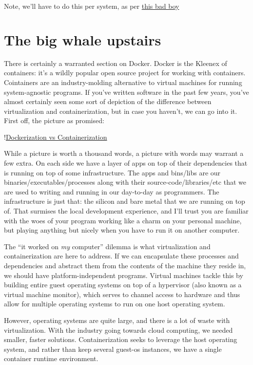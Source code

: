 \documentclass[11pt, twoside, reqno]{book}
\begin{document}
Note, we'll have to do this per system, as per \href{https://www.digitalocean.com/community/questions/error-permission-denied-publickey-when-i-try-to-ssh}{this bad boy}

\section{The big whale upstairs}

There is certainly a warranted section on Docker. Docker is the Kleenex of containers: it's a wildly popular open source project for working with containers. Cointainers are an industry-molding alternative to virtual machines for running system-agnostic programs. If you've written software in the past few years, you've almost certainly seen some sort of depiction of the difference between virtualization and containerization, but in case you haven't, we can go into it. First off, the picture as promised:

!\href{https://blog.netapp.com/wp-content/uploads/2016/03/Screen-Shot-2018-03-20-at-9.24.09-AM-1024x548.png}{Dockerization vs Containerization}

While a picture is worth a thousand words, a picture with words may warrant a few extra. On each side we have a layer of apps on top of their dependencies that is running on top of some infrastructure. The apps and bins/libs are our binaries/executables/processes along with their source-code/libraries/etc that we are used to writing and running in our day-to-day as programmers. The infrastructure is just that: the silicon and bare metal that we are running on top of. That surmises the local development experience, and I'll trust you are familiar with the woes of your program working like a charm on your personal machine, but playing anything but nicely when you have to run it on another computer.

The ``it worked on \textit{my} computer'' dilemma is what virtualization and containerization are here to address. If we can encapsulate these processes and dependencies and abstract them from the contents of the machine they reside in, we should have platform-independent programs. Virtual machines tackle this by building entire guest operating systems on top of a hypervisor (also known as a virtual machine monitor), which serves to channel access to hardware and thus allow for multiple operating systems to run on one host operating system.

However, operating systems are quite large, and there is a lot of waste with virtualization. With the industry going towards cloud computing, we needed smaller, faster solutions. Containerization seeks to leverage the host operating system, and rather than keep several guest-os instances, we have a single container runtime environment.
\end{document}
